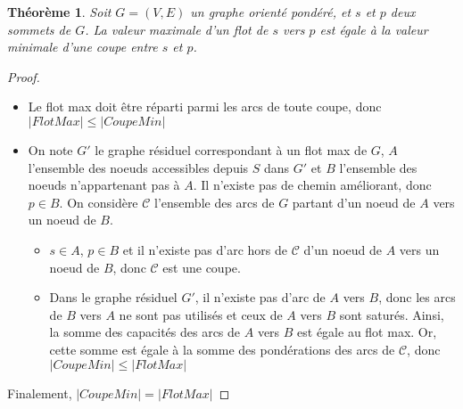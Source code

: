 \documentclass[11pt,a4paper]{article}
\newtheorem*{theorem}{Théorème} %
\begin{document}
\begin{figure}[ht]
\begin{minipage}{.5\textwidth}
  \end{minipage}
\end{figure}

\begin{theorem}
Soit \(G=(V,E)\) un graphe orienté pondéré, et \(s\) et \(p\) deux sommets de \(G\). La valeur maximale d'un flot de \(s\) vers \(p\) est égale à la valeur minimale d'une coupe entre \(s\) et \(p\).
\end{theorem}
\begin{proof}\leavevmode
  \begin{itemize}
    \item Le flot max doit être réparti parmi les arcs de toute coupe, donc \( \left| FlotMax \right| \leq \left| CoupeMin \right| \)
    \item On note \(G'\) le graphe résiduel correspondant à un flot max de \(G\), \(A\) l'ensemble des noeuds accessibles depuis \(S\) dans \(G'\) et \(B\) l'ensemble des noeuds n'appartenant pas à \(A\). Il n'existe pas de chemin améliorant, donc \(p \in B\). On considère \(\mathcal{C}\) l'ensemble des arcs de \(G\) partant d'un noeud de \(A\) vers un noeud de \(B\).
    \begin{itemize}
        \item \(s \in A\), \(p \in B\) et il n'existe pas d'arc hors de \(\mathcal{C}\) d'un noeud de \(A\) vers un noeud de \(B\), donc \(\mathcal{C}\) est une coupe.
        \item Dans le graphe résiduel \(G'\), il n'existe pas d'arc de \(A\) vers \(B\), donc les arcs de \(B\) vers \(A\) ne sont pas utilisés et ceux de \(A\) vers \(B\) sont saturés. Ainsi, la somme des capacités des arcs de \(A\) vers \(B\) est égale au flot max. Or, cette somme est égale à la somme des pondérations des arcs de \(\mathcal{C}\), donc \( \left| CoupeMin \right| \leq \left| FlotMax \right| \)
    \end{itemize}
  \end{itemize}
  Finalement, \( \left| CoupeMin \right| = \left| FlotMax \right| \)
\end{proof}
\end{document}

